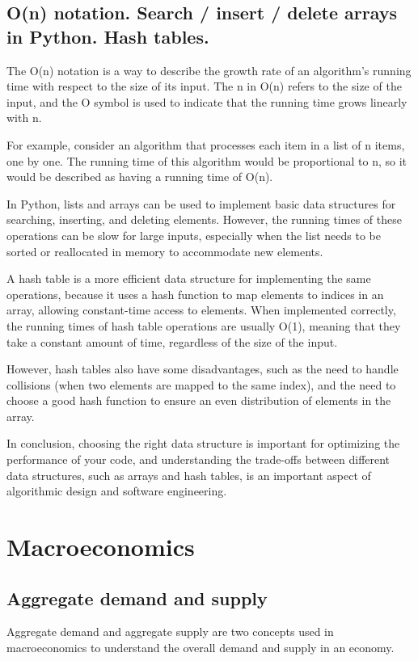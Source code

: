 \documentclass[12pt, a4paper, oneside]{article}
\begin{document}
\subsection{ O(n) notation. Search / insert / delete arrays in Python. Hash tables.   }
The O(n) notation is a way to describe the growth rate of an algorithm's running time with respect to the size of its input. The n in O(n) refers to the size of the input, and the O symbol is used to indicate that the running time grows linearly with n.

For example, consider an algorithm that processes each item in a list of n items, one by one. The running time of this algorithm would be proportional to n, so it would be described as having a running time of O(n).

In Python, lists and arrays can be used to implement basic data structures for searching, inserting, and deleting elements. However, the running times of these operations can be slow for large inputs, especially when the list needs to be sorted or reallocated in memory to accommodate new elements.

A hash table is a more efficient data structure for implementing the same operations, because it uses a hash function to map elements to indices in an array, allowing constant-time access to elements. When implemented correctly, the running times of hash table operations are usually O(1), meaning that they take a constant amount of time, regardless of the size of the input.

However, hash tables also have some disadvantages, such as the need to handle collisions (when two elements are mapped to the same index), and the need to choose a good hash function to ensure an even distribution of elements in the array.

In conclusion, choosing the right data structure is important for optimizing the performance of your code, and understanding the trade-offs between different data structures, such as arrays and hash tables, is an important aspect of algorithmic design and software engineering.

\section{Macroeconomics  }
\subsection{ Aggregate demand and supply }
Aggregate demand and aggregate supply are two concepts used in macroeconomics to understand the overall demand and supply in an economy.
\end{document}
